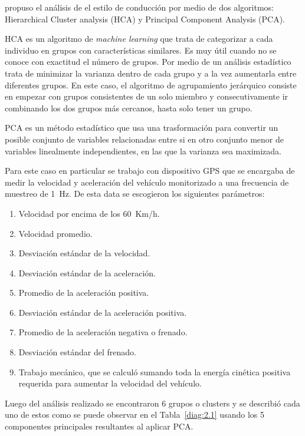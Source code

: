 \citeauthor{constantinescu} \cite{constantinescu} propuso el análisis de el estilo de conducción por medio de dos algoritmos: Hierarchical Cluster analysis (HCA) y Principal Component Analysis (PCA).

HCA es un algoritmo de {\it machine learning} que trata de categorizar a cada individuo en grupos con características similares. Es muy útil cuando no se conoce con exactitud el número de grupos. Por medio de un análisis estadístico trata de minimizar la varianza dentro de cada grupo y a la vez aumentarla entre diferentes grupos. En este caso, el algoritmo de agrupamiento jerárquico consiste en empezar con grupos consistentes de un solo miembro y consecutivamente ir combinando los dos grupos más cercanos, hasta solo tener un grupo.

PCA es un método estadístico que usa una trasformación para convertir un posible conjunto de variables relacionadas entre si en otro conjunto menor de variables linealmente independientes, en las que la varianza sea maximizada.

Para este caso en particular se trabajo con dispositivo GPS que se encargaba de medir la velocidad y aceleración del vehículo monitorizado a una frecuencia de muestreo de \SI[mode=text]{1}{Hz}. De esta data se escogieron los siguientes parámetros:
\begin{enumerate}
    \itemsep0em
    \item Velocidad por encima de los \SI[mode=text]{60}{Km/h}.
    \item Velocidad promedio.
    \item Desviación estándar de la velocidad.
    \item Desviación estándar de la aceleración.
    \item Promedio de la aceleración positiva.
    \item Desviación estándar de la aceleración positiva.
    \item Promedio de la aceleración negativa o frenado.
    \item Desviación estándar del frenado.
    \item Trabajo mecánico, que se calculó sumando toda la energía cinética positiva requerida para aumentar la velocidad del vehículo.
\end{enumerate}

Luego del análisis realizado se encontraron 6 grupos o clusters y se describió cada uno de estos como se puede observar en el Tabla~\ref{diag:2.1} usando los 5 componentes principales resultantes al aplicar PCA.

